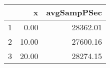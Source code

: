 \begin{table}[h]
\centering
\begin{tabular}{rrr}
  \hline
 & x & avgSampPSec \\ 
  \hline
1 & 0.00 & 28362.01 \\ 
   \hline
2 & 10.00 & 27600.16 \\ 
   \hline
3 & 20.00 & 28274.15 \\ 
   \hline
\end{tabular}
\end{table}
